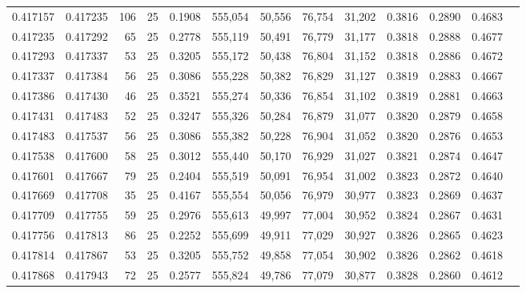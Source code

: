 \begin{tabular}{rrrrrrrrrrrrr}
0.417157 & 0.417235 &   106 &  25 &                                     0.1908 & 555,054 &  50,556 &  76,754 &  31,202 & 0.3816 & 0.2890 & 0.4683 \\
0.417235 & 0.417292 &    65 &  25 &                                     0.2778 & 555,119 &  50,491 &  76,779 &  31,177 & 0.3818 & 0.2888 & 0.4677 \\
0.417293 & 0.417337 &    53 &  25 &                                     0.3205 & 555,172 &  50,438 &  76,804 &  31,152 & 0.3818 & 0.2886 & 0.4672 \\
0.417337 & 0.417384 &    56 &  25 &                                     0.3086 & 555,228 &  50,382 &  76,829 &  31,127 & 0.3819 & 0.2883 & 0.4667 \\
0.417386 & 0.417430 &    46 &  25 &                                     0.3521 & 555,274 &  50,336 &  76,854 &  31,102 & 0.3819 & 0.2881 & 0.4663 \\
0.417431 & 0.417483 &    52 &  25 &                                     0.3247 & 555,326 &  50,284 &  76,879 &  31,077 & 0.3820 & 0.2879 & 0.4658 \\
0.417483 & 0.417537 &    56 &  25 &                                     0.3086 & 555,382 &  50,228 &  76,904 &  31,052 & 0.3820 & 0.2876 & 0.4653 \\
0.417538 & 0.417600 &    58 &  25 &                                     0.3012 & 555,440 &  50,170 &  76,929 &  31,027 & 0.3821 & 0.2874 & 0.4647 \\
0.417601 & 0.417667 &    79 &  25 &                                     0.2404 & 555,519 &  50,091 &  76,954 &  31,002 & 0.3823 & 0.2872 & 0.4640 \\
0.417669 & 0.417708 &    35 &  25 &                                     0.4167 & 555,554 &  50,056 &  76,979 &  30,977 & 0.3823 & 0.2869 & 0.4637 \\
0.417709 & 0.417755 &    59 &  25 &                                     0.2976 & 555,613 &  49,997 &  77,004 &  30,952 & 0.3824 & 0.2867 & 0.4631 \\
0.417756 & 0.417813 &    86 &  25 &                                     0.2252 & 555,699 &  49,911 &  77,029 &  30,927 & 0.3826 & 0.2865 & 0.4623 \\
0.417814 & 0.417867 &    53 &  25 &                                     0.3205 & 555,752 &  49,858 &  77,054 &  30,902 & 0.3826 & 0.2862 & 0.4618 \\
0.417868 & 0.417943 &    72 &  25 &                                     0.2577 & 555,824 &  49,786 &  77,079 &  30,877 & 0.3828 & 0.2860 & 0.4612 \\

\end{tabular}
